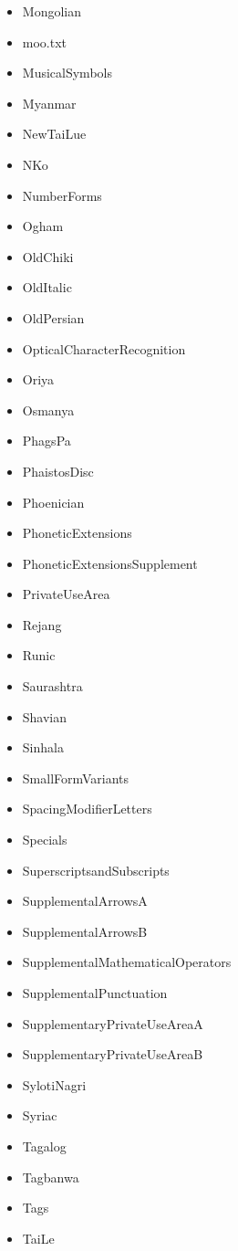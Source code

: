 \documentclass{article}
\newenvironment{itemlist}{%
  \begin{itemize}
	\setlength{\itemsep}{0pt}
	\setlength{\parsep}{0pt}
	\setlength{\topsep}{0pt}
	\setlength{\partopsep}{0pt}
	\setlength{\parskip}{0pt}
	\setlength{\labelsep}{5pt}}%
{
  \end{itemize}}
\begin{document}
\begin{multicols}{2}
\begin{itemlist}
				\item Mongolian
				\item moo.txt
				\item MusicalSymbols
				\item Myanmar
				\item NewTaiLue
				\item NKo
				\item NumberForms
				\item Ogham
				\item OldChiki
				\item OldItalic
				\item OldPersian
				\item OpticalCharacterRecognition
				\item Oriya
				\item Osmanya
				\item PhagsPa
				\item PhaistosDisc
				\item Phoenician
				\item PhoneticExtensions
				\item PhoneticExtensionsSupplement
				\item PrivateUseArea
				\item Rejang
				\item Runic
				\item Saurashtra
				\item Shavian
				\item Sinhala
				\item SmallFormVariants
				\item SpacingModifierLetters
				\item Specials
				\item SuperscriptsandSubscripts
				\item SupplementalArrowsA
				\item SupplementalArrowsB
				\item SupplementalMathematicalOperators
				\item SupplementalPunctuation
				\item SupplementaryPrivateUseAreaA
				\item SupplementaryPrivateUseAreaB
				\item SylotiNagri
				\item Syriac
				\item Tagalog
				\item Tagbanwa
				\item Tags
				\item TaiLe

\end{itemlist}
\end{multicols}
\end{document}
